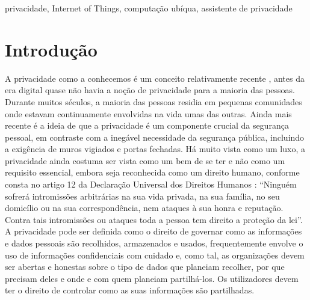 \documentclass[conference]{IEEEtran}
\begin{document}
\begin{IEEEkeywords}
privacidade, Internet of Things, computação ubíqua, assistente de privacidade

\end{IEEEkeywords}

\section{Introdução}

A privacidade como a conhecemos é um conceito relativamente recente \cite{vincent2016privacy, moore2017privacy},
antes da era digital quase não havia a noção de privacidade para a maioria
das pessoas. Durante muitos séculos, a maioria das pessoas residia em pequenas
comunidades onde estavam continuamente envolvidas na vida umas das outras.
Ainda mais recente é a ideia de que a privacidade é um componente crucial da
segurança pessoal, em contraste com a inegável necessidade da segurança pública,
incluindo a exigência de muros vigiados e portas fechadas. Há muito vista
como um luxo, a privacidade ainda costuma ser vista como um bem de se ter
e não como um requisito essencial, embora seja reconhecida como um direito
humano, conforme consta no artigo 12 da Declaração Universal dos Direitos
Humanos \cite{RooseveltUniversal}: ``Ninguém sofrerá intromissões arbitrárias
na sua vida privada, na sua família, no seu domicílio ou na sua correspondência,
nem ataques à sua honra e reputação. Contra tais intromissões ou ataques
toda a pessoa tem direito a proteção da lei''. A privacidade pode ser definida
\cite{InternationalWhat, SpiekermannEngineering} como o direito de governar
como as informações e dados pessoais são recolhidos, armazenados e usados,
frequentemente envolve o uso de informações confidenciais com cuidado e, como
tal, as organizações devem ser abertas e honestas sobre o tipo de dados que
planeiam recolher, por que precisam deles e onde e com quem planeiam
partilhá-los. Os utilizadores devem ter o direito de controlar como as suas
informações são partilhadas.
\end{document}
